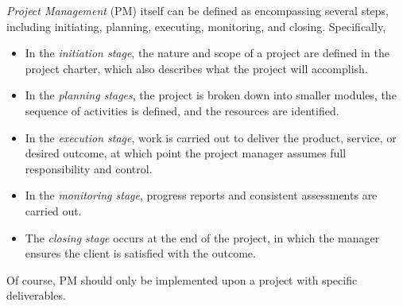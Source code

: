 \documentclass[oneside, 11pt]{book}
\begin{document}
\bigskip
\emph{Project Management} (PM) itself can be defined as encompassing several steps, including initiating, planning, executing, monitoring, and closing. Specifically,
\begin{itemize}
    \item In the \emph{initiation stage}, the nature and scope of a project are defined in the project charter, which also describes what the project will accomplish.

    \item In the \emph{planning stages}, the project is broken down into smaller modules, the sequence of activities is defined, and the resources are identified.

    \item In the \emph{execution stage}, work is carried out to deliver the product, service, or desired outcome, at which point the project manager assumes full responsibility and control.

    \item In the \emph{monitoring stage}, progress reports and consistent assessments are carried out.

    \item The \emph{closing stage} occurs at the end of the project, in which the manager ensures the client is satisfied with the outcome.
\end{itemize}
Of course, PM should only be implemented upon a project with specific deliverables.

%
%
%
%
\end{document}
